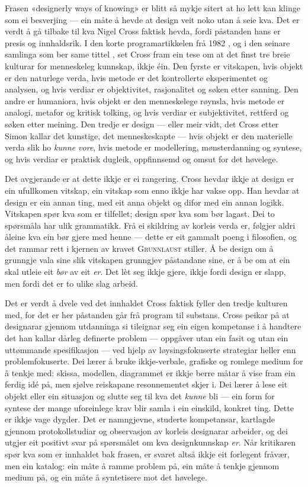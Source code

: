 Frasen «designerly ways of knowing» er blitt så mykje sitert at ho lett kan klinge som ei besverjing — ein måte å hevde at design veit noko utan å seie kva. Det er verdt å gå tilbake til kva Nigel Cross faktisk hevda, fordi påstanden hans er presis og innhaldsrik. I den korte programartikkelen frå 1982 \autocite{cross1982}, og i den seinare samlinga som ber same tittel \autocite{cross2006}, set Cross fram ein tese om at det finst tre breie kulturar for menneskeleg kunnskap, ikkje éin. Den fyrste er vitskapen, hvis objekt er den naturlege verda, hvis metode er det kontrollerte eksperimentet og analysen, og hvis verdiar er objektivitet, rasjonalitet og søken etter sanning. Den andre er humaniora, hvis objekt er den menneskelege røynsla, hvis metode er analogi, metafor og kritisk tolking, og hvis verdiar er subjektivitet, rettferd og søken etter meining. Den tredje er design — eller meir vidt, det Cross etter Simon kallar det kunstige, det menneskeskapte — hvis objekt er den materielle verda slik ho \emph{kunne vore}, hvis metode er modellering, mønsterdanning og syntese, og hvis verdiar er praktisk dugleik, oppfinnsemd og omsut for det høvelege.

Det avgjerande er at dette ikkje er ei rangering. Cross hevdar ikkje at design er ein ufullkomen vitskap, ein vitskap som enno ikkje har vakse opp. Han hevdar at design er ein annan ting, med eit anna objekt og difor med ein annan logikk. Vitskapen spør kva som er tilfellet; design spør kva som bør lagast. Dei to spørsmåla har ulik grammatikk. Frå ei skildring av korleis verda er, følgjer aldri åleine kva ein bør gjere med henne — dette er eit gammalt poeng i filosofien, og det rammar rett i kjernen av kravet \textsc{Grunnlaust} stiller. Å be design om å grunngje vala sine slik vitskapen grunngjev påstandane sine, er å be om at ein skal utleie eit \emph{bør} av eit \emph{er}. Det lèt seg ikkje gjere, ikkje fordi design er slapp, men fordi det er to ulike slag arbeid.

Det er verdt å dvele ved det innhaldet Cross faktisk fyller den tredje kulturen med, for det er her påstanden går frå program til substans. Cross peikar på at designarar gjennom utdanninga si tileignar seg ein eigen kompetanse i å handtere det han kallar dårleg definerte problem — oppgåver utan ein fasit og utan ein uttømmande spesifikasjon — ved hjelp av løysingsfokuserte strategiar heller enn problemfokuserte. Dei lærer å bruke ikkje-verbale, grafiske og romlege medium for å tenkje med: skissa, modellen, diagrammet er ikkje berre måtar å vise fram ein ferdig idé på, men sjølve reiskapane resonnementet skjer i. Dei lærer å lese eit objekt eller ein situasjon og slutte seg til kva det \emph{kunne} bli — ein form for syntese der mange uforeinlege krav blir samla i ein einskild, konkret ting. Dette er ikkje vage dygder. Det er namngjevne, studerte kompetansar, kartlagde gjennom protokollstudiar og observasjon av korleis designarar arbeider, og dei utgjer eit positivt svar på spørsmålet om kva designkunnskap \emph{er}. Når kritikaren spør kva som er innhaldet bak frasen, er svaret altså ikkje eit forlegent fråvær, men ein katalog: ein måte å ramme problem på, ein måte å tenkje gjennom medium på, og ein måte å syntetisere mot det høvelege.

